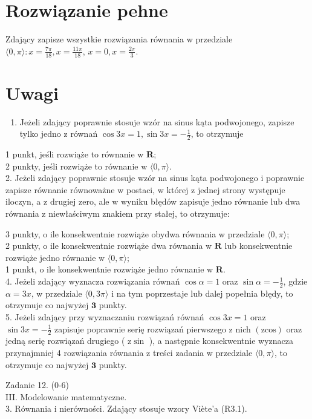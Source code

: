 \documentclass[10pt]{article}
\begin{document}
\section*{Rozwiązanie pehne}
Zdający zapisze wszystkie rozwiązania równania w przedziale $\langle 0, \pi\rangle: x=\frac{7 \pi}{18}, x=\frac{11 \pi}{18}$, $x=0, x=\frac{2 \pi}{3}$.

\section*{Uwagi}
\begin{enumerate}
  \item Jeżeli zdający poprawnie stosuje wzór na sinus kąta podwojonego, zapisze tylko jedno z równań $\cos 3 x=1, \sin 3 x=-\frac{1}{2}$, to otrzymuje
\end{enumerate}

1 punkt, jeśli rozwiąże to równanie w $\mathbf{R}$;\\
2 punkty, jeśli rozwiąże to równanie w $\langle 0, \pi\rangle$.\\
2. Jeżeli zdający poprawnie stosuje wzór na sinus kąta podwojonego i poprawnie zapisze równanie równoważne w postaci, w której z jednej strony występuje iloczyn, a z drugiej zero, ale w wyniku błędów zapisuje jedno równanie lub dwa równania z niewłaściwym znakiem przy stałej, to otrzymuje:

3 punkty, o ile konsekwentnie rozwiąże obydwa równania w przedziale $\langle 0, \pi\rangle$;\\
2 punkty, o ile konsekwentnie rozwiąże dwa równania w $\mathbf{R}$ lub konsekwentnie rozwiąże jedno równanie w $\langle 0, \pi\rangle$;\\
1 punkt, o ile konsekwentnie rozwiąże jedno równanie w $\mathbf{R}$.\\
4. Jeżeli zdający wyznacza rozwiązania równań $\cos \alpha=1$ oraz $\sin \alpha=-\frac{1}{2}$, gdzie $\alpha=3 x$, w przedziale $\langle 0,3 \pi\rangle$ i na tym poprzestaje lub dalej popełnia błędy, to otrzymuje co najwyżej $\mathbf{3}$ punkty.\\
5. Jeżeli zdający przy wyznaczaniu rozwiązań równań $\cos 3 x=1$ oraz $\sin 3 x=-\frac{1}{2}$ zapisuje poprawnie serię rozwiązań pierwszego z nich $(\mathrm{zcos})$ oraz jedną serię rozwiązań drugiego ( $\mathrm{z} \sin$ ), a następnie konsekwentnie wyznacza przynajmniej 4 rozwiązania równania z treści zadania w przedziale $\langle 0, \pi\rangle$, to otrzymuje co najwyżej $\mathbf{3}$ punkty.

Zadanie 12. (0-6)\\
III. Modelowanie matematyczne.\\
3. Równania i nierówności. Zdający stosuje wzory Viète'a (R3.1).
\end{document}
